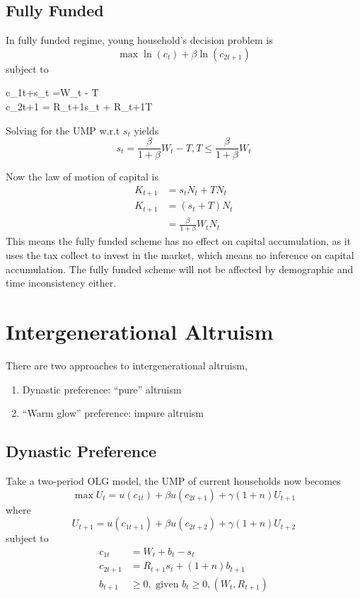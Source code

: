 \documentclass[twocolumn, fleqn]{article}
\begin{document}
		\subsection{Fully Funded}\label{subsec:fully-funded}
			In fully funded regime, young household's decision problem is
			\[\max \ln(c_t)+\beta \ln (c_{2t+1})\]
			subject to
			\begin{cases}
				c_{1t}+s_t =W_t - T\\
				c_{2t+1} = R_{t+1}s_t + R_{t+1}T
			\end{cases}

			Solving for the UMP w.r.t $s_t$ yields \[s_t = \frac{\beta}{1+\beta}W_t -T, T\leq \frac{\beta}{1+\beta}W_t\]

			Now the law of motion of capital is
			\begin{align*}
				K_{t+1} &= s_t N_t + TN_t \\
				K_{t+1} &= (s_t + T)N_t \\
						&= \frac{\beta}{1+\beta}W_t N_t
			\end{align*}
			This means the fully funded scheme has no effect on capital accumulation, as it uses the tax collect to
			invest in the market, which means no inference on capital accumulation.
			The fully funded scheme will not be affected by demographic and time inconsistency either.

	\section{Intergenerational Altruism}
		There are two approaches to intergenerational altruism,
		\begin{enumerate}
			\item Dynastic preference: ``pure'' altruism
			\item ``Warm glow'' preference: impure altruism
		\end{enumerate}

		\subsection{Dynastic Preference}
			Take a two-period OLG model, the UMP of current households now becomes
			\[
				\max U_t = u(c_{1t}) +\beta u(c_{2t+1})+\gamma(1+n)U_{t+1}
			\]
			where
			\[
				U_{t+1} = u(c_{1t+1}) +\beta u(c_{2t+2})+\gamma(1+n)U_{t+2}
			\]
			subject to
			\begin{align*}
				c_{1t} &= W_t + b_t - s_t\\
				c_{2t+1} &= R_{t+1}s_t  +(1+n)b_{t+1}\\
				b_{t+1} &\geq 0, \text{ given } b_t \geq 0, (W_t, R_{t+1})
			\end{align*}
\end{document}
